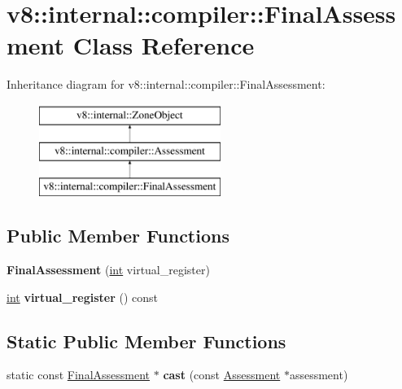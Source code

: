 \hypertarget{classv8_1_1internal_1_1compiler_1_1FinalAssessment}{}\section{v8\+:\+:internal\+:\+:compiler\+:\+:Final\+Assessment Class Reference}
\label{classv8_1_1internal_1_1compiler_1_1FinalAssessment}
Inheritance diagram for v8\+:\+:internal\+:\+:compiler\+:\+:Final\+Assessment\+:\begin{figure}[H]
\begin{center}
\leavevmode
\includegraphics[height=3.000000cm]{classv8_1_1internal_1_1compiler_1_1FinalAssessment}
\end{center}
\end{figure}
\subsection*{Public Member Functions}
\begin{DoxyCompactItemize}
\item 
\mbox{\label{classv8_1_1internal_1_1compiler_1_1FinalAssessment_a7c8d3cefbca0be5c1ae757d154523426}} 
{\bfseries Final\+Assessment} (\mbox{\hyperlink{classint}{int}} virtual\+\_\+register)
\item 
\mbox{\label{classv8_1_1internal_1_1compiler_1_1FinalAssessment_a4c0091e472eccd45f8f696f25c48852d}} 
\mbox{\hyperlink{classint}{int}} {\bfseries virtual\+\_\+register} () const
\end{DoxyCompactItemize}
\subsection*{Static Public Member Functions}
\begin{DoxyCompactItemize}
\item 
\mbox{\label{classv8_1_1internal_1_1compiler_1_1FinalAssessment_aac41b7699345d7941317b9e747329f4f}} 
static const \mbox{\hyperlink{classv8_1_1internal_1_1compiler_1_1FinalAssessment}{Final\+Assessment}} $\ast$ {\bfseries cast} (const \mbox{\hyperlink{classv8_1_1internal_1_1compiler_1_1Assessment}{Assessment}} $\ast$assessment)
\end{DoxyCompactItemize}

